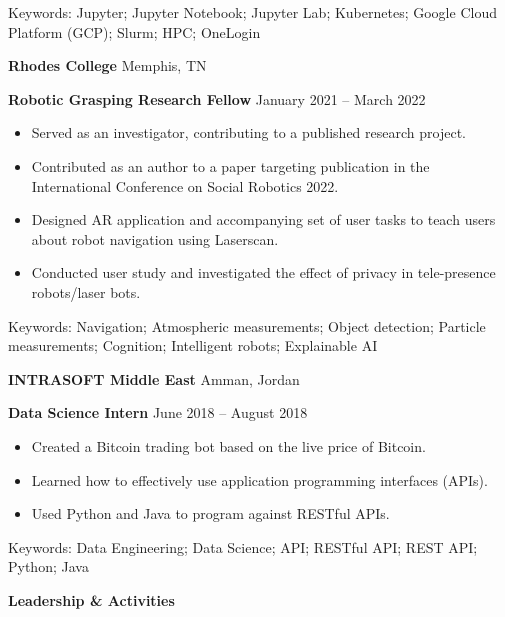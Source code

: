 \documentclass[11pt]{article}
\begin{document}
Keywords: Jupyter; Jupyter Notebook; Jupyter Lab; Kubernetes; Google Cloud Platform (GCP); Slurm; HPC; OneLogin

\vspace{12pt}

\textbf{Rhodes College} \hfill Memphis, TN

\textbf{Robotic Grasping Research Fellow} \hfill January 2021 – March 2022
\begin{itemize}[noitemsep]
    \item Served as an investigator, contributing to a published research project.
    \item Contributed as an author to a paper targeting publication in the International Conference on Social Robotics 2022.
    \item Designed AR application and accompanying set of user tasks to teach users about robot navigation using Laserscan.
    \item Conducted user study and investigated the effect of privacy in tele-presence robots/laser bots.
\end{itemize}

\vspace{6pt}

Keywords: Navigation; Atmospheric measurements; Object detection; Particle measurements; Cognition; Intelligent robots; Explainable AI

\vspace{12pt}

\textbf{INTRASOFT Middle East} \hfill Amman, Jordan

\textbf{Data Science Intern} \hfill June 2018 – August 2018
\begin{itemize}[noitemsep]
    \item Created a Bitcoin trading bot based on the live price of Bitcoin.
    \item Learned how to effectively use application programming interfaces (APIs).
    \item Used Python and Java to program against RESTful APIs.
\end{itemize}

\vspace{6pt}

Keywords: Data Engineering; Data Science; API; RESTful API; REST API; Python; Java

\vspace{12pt}

\begin{center}
    \textbf{Leadership \& Activities}
\end{center}
\end{document}
